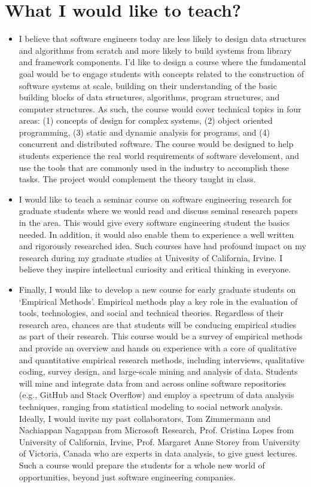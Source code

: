 \documentclass[a4paper]{article}
\begin{document}
\section*{What I would like to teach?}

\begin{itemize}

\item I believe that software engineers today are less likely to design data structures and algorithms from scratch and more likely to build systems from library and framework components.
I'd like to design a course where the fundamental goal would be to engage students with concepts related to the construction of software systems at scale, building on their understanding of the basic building blocks of data structures, algorithms, program structures, and computer structures. 
As such, the course would cover technical topics in four areas: (1) concepts of design for complex systems, (2) object oriented programming, (3) static and dynamic analysis for programs, and (4) concurrent and distributed software.
The course would be designed to help students experience the real world requirements of software develoment, and use the tools that are commonly used in the industry to accomplish these tasks. The project would complement the theory taught in class.

\item I would like to teach a seminar course on software engineering research for graduate students where we would read and discuss seminal research papers in the area. This would give every software engineering student the basics needed. In addition, it would also enable them to experience a well written and rigorously researched idea. Such courses have had profound impact on my research during my graduate studies at Univesity of California, Irvine. I believe they inspire intellectual curiosity and critical thinking in everyone. 

\item Finally, I would like to develop a new course for early graduate students on ‘Empirical Methods’. Empirical methods play a key role in the evaluation of tools, technologies, and social and technical theories. Regardless of their research area, chances are that students will be conducing empirical studies as part of their research. This course would be a survey of empirical methods and provide an overview and hands on experience with a core of qualitative and quantitative empirical research methods, including interviews, qualitative coding, survey design, and large-scale mining and analysis of data. Students will mine and integrate data from and across online software repositories (e.g., GitHub and Stack Overflow) and employ a spectrum of data analysis techniques, ranging from statistical modeling to social network analysis. Ideally, I would invite my past collaborators, Tom Zimmermann and Nachiappan Nagappan from Microsoft Research, Prof. Cristina Lopes from University of California, Irvine, Prof. Margaret Anne Storey from University of Victoria, Canada who are experts in data analysis, to give guest lectures. Such a course would prepare the students for a whole new world of opportunities, beyond just software engineering companies.
\end{itemize}
\end{document}
